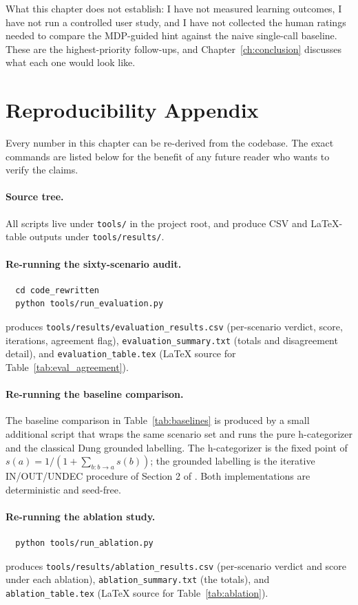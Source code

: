 What this chapter does not establish: I have not measured learning outcomes, I have not run a controlled user study, and I have not collected the human ratings needed to compare the MDP-guided hint against the naive single-call baseline. These are the highest-priority follow-ups, and Chapter~\ref{ch:conclusion} discusses what each one would look like.

\section{Reproducibility Appendix}
\label{sec:eval_repro}
Every number in this chapter can be re-derived from the codebase. The exact commands are listed below for the benefit of any future reader who wants to verify the claims.

\paragraph{Source tree.} All scripts live under \texttt{tools/} in the project root, and produce CSV and LaTeX-table outputs under \texttt{tools/results/}.

\paragraph{Re-running the sixty-scenario audit.}
\begin{verbatim}
  cd code_rewritten
  python tools/run_evaluation.py
\end{verbatim}
\noindent produces \texttt{tools/results/evaluation\_results.csv} (per-scenario verdict, score, iterations, agreement flag), \texttt{evaluation\_summary.txt} (totals and disagreement detail), and \texttt{evaluation\_table.tex} (LaTeX source for Table~\ref{tab:eval_agreement}).

\paragraph{Re-running the baseline comparison.}
The baseline comparison in Table~\ref{tab:baselines} is produced by a small additional script that wraps the same scenario set and runs the pure h-categorizer and the classical Dung grounded labelling. The h-categorizer is the fixed point of $s(a)=1/(1+\sum_{b: b \to a} s(b))$; the grounded labelling is the iterative IN/OUT/UNDEC procedure of Section 2 of \cite{dung1995acceptability}. Both implementations are deterministic and seed-free.

\paragraph{Re-running the ablation study.}
\begin{verbatim}
  python tools/run_ablation.py
\end{verbatim}
\noindent produces \texttt{tools/results/ablation\_results.csv} (per-scenario verdict and score under each ablation), \texttt{ablation\_summary.txt} (the totals), and \texttt{ablation\_table.tex} (LaTeX source for Table~\ref{tab:ablation}).

